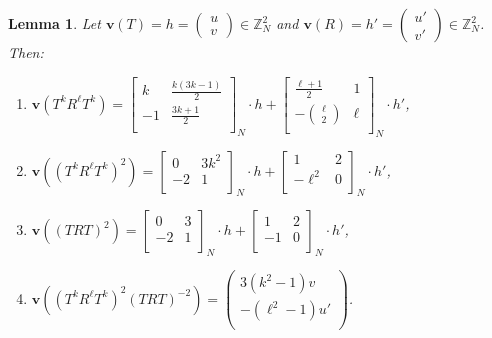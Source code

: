 \documentclass[10pt]{amsart}
\theoremstyle{plain}
\newtheorem{lemma}[theorem]{Lemma}
\theoremstyle{definition}
\theoremstyle{remark}%
\newcommand{\Z}{\mathbb{Z}}
\newcommand{\f}{\mathbf{v}}
\newcommand{\mat}[4]{\left(\begin{array}{cc}
 #1 & #2\\
 #3 & #4\\
\end{array}\right)}
\newcommand{\matN}[4]{\left[\begin{array}{cc}
 #1 & #2\\
 #3 & #4\\
\end{array}\right]_N}
\newcommand{\vc}[2]{\left(\begin{array}{c}
 #1 \\
 #2\\
\end{array}\right)}
\begin{document}
\begin{lemma}\label{4.1}
Let  $\f(T)=h=\left(\begin{smallmatrix}u\\v\end{smallmatrix}\right)\in\Z_N^2$ and $\f(R)=h'=\left(\begin{smallmatrix}u'\\v'\end{smallmatrix}\right)\in\Z_N^2$. Then:
\begin{enumerate}
\item[(i)] $\f(T^k R^\ell T^k)=\matN{k}{\frac{k(3k-1)}{2}}{-1}{\frac{3k+1}{2}}\cdot h+\matN{\frac{\ell+1}{2}}{1}{-{\ell\choose 2}}{\ell}\cdot h'$,


\item[(ii)] $\f\left(\left(T^k R^\ell T^k\right)^{2}\right)= \matN{0}{3k^2}{-2}{1}\cdot h+\matN{1}{2}{-\ell^2}{0}\cdot h'$,

\item[(iii)] $\f\left(\left(TRT\right)^{2}\right)=\matN{0}{3}{-2}{1}\cdot h+\matN{1}{2}{-1}{0}\cdot h'$,

\item[(iv)] $\f\left(\left(T^k R^\ell T^k\right)^{2}\left(TRT\right)^{-2}\right)= \vc{3(k^2-1)v}{-(\ell^2-1)u'}$.
$$$$
\end{enumerate}
\end{lemma}
\end{document}
